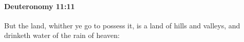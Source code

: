 
		\paragraph{Deuteronomy 11:11} %
			\label{DEUTERONOMY-11-11}

			But the land, whither ye go to possess it, is a land of hills and valleys, and drinketh water of the rain of heaven:



